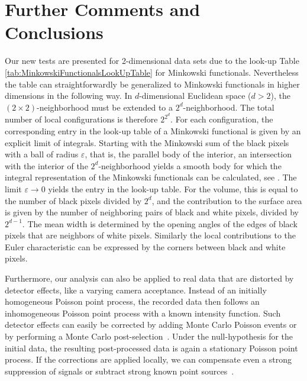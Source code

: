 \documentclass[12pt]{article}
\begin{document}
\section{Further Comments and Conclusions}\label{sec:comm.conc}
Our new tests are presented for 2-dimensional data sets due to the look-up Table \ref{tab:MinkowskiFunctionalsLookUpTable} for Minkowski functionals. Nevertheless the table can straightforwardly be generalized to Minkowski functionals in higher dimensions in the following way. In $d$-dimensional Euclidean space ($d>2$), the $(2\times2)$-neighborhood must be extended to a $2^d$-neighborhood. The total number of local configurations is therefore $2^{2^d}$. For each configuration, the corresponding entry in the look-up table of a Minkowski functional is given by an explicit limit of integrals. Starting with the Minkowski sum of the black pixels with a ball of radius $\varepsilon$, that is, the parallel body of the interior, an intersection with the interior of the $2^d$-neighborhood yields a smooth body for which the integral representation of the Minkowski functionals can be calculated, see \cite{43}. The limit $\varepsilon\rightarrow 0$ yields the entry in the look-up table. For the volume, this is equal to the number of black pixels divided by $2^d$, and the contribution to the surface area is given by the number of neighboring pairs of black and white pixels, divided by $2^{d-1}$. The mean width is determined by the opening angles of the edges of black pixels that are neighbors of white pixels. Similarly the local contributions to the Euler characteristic can be expressed by the corners between black and white pixels.

Furthermore, our analysis can also be applied to real data that are distorted by detector effects, like a varying camera acceptance. Instead of an initially homogeneous Poisson point process, the recorded data then follows an inhomogeneous Poisson point process with a known intensity function. Such detector effects can easily be corrected by adding Monte Carlo Poisson events or by performing a Monte Carlo post-selection~\cite{Goering2012,24}. Under the null-hypothesis for the initial data, the resulting post-processed data is again a stationary Poisson point process. If the corrections are applied locally, we can compensate even a strong suppression of signals or subtract strong known point sources~\cite{44}.
\end{document}
